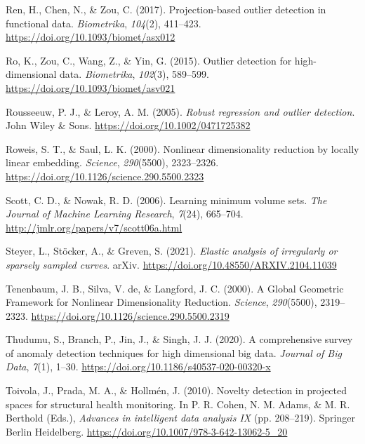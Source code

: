 \documentclass[
  10pt]{article}
\newlength{\cslhangindent}
\newlength{\cslentryspacingunit} %
\newenvironment{CSLReferences}[2] %
 {%
  \setlength{\parindent}{0pt}
  \ifodd #1
  \let\oldpar\par
  \def\par{\hangindent=\cslhangindent\oldpar}
  \fi
  \setlength{\parskip}{#2\cslentryspacingunit}
 }%
 {}
\begin{document}
\begin{CSLReferences}{1}{0}
\leavevmode{}%
Ren, H., Chen, N., \& Zou, C. (2017). Projection-based outlier detection in functional data. \emph{Biometrika}, \emph{104}(2), 411--423. \url{https://doi.org/10.1093/biomet/asx012}

\leavevmode{}%
Ro, K., Zou, C., Wang, Z., \& Yin, G. (2015). Outlier detection for high-dimensional data. \emph{Biometrika}, \emph{102}(3), 589--599. \url{https://doi.org/10.1093/biomet/asv021}

\leavevmode{}%
Rousseeuw, P. J., \& Leroy, A. M. (2005). \emph{Robust regression and outlier detection}. John Wiley \& Sons. \url{https://doi.org/10.1002/0471725382}

\leavevmode{}%
Roweis, S. T., \& Saul, L. K. (2000). Nonlinear dimensionality reduction by locally linear embedding. \emph{Science}, \emph{290}(5500), 2323--2326. \url{https://doi.org/10.1126/science.290.5500.2323}

\leavevmode{}%
Scott, C. D., \& Nowak, R. D. (2006). Learning minimum volume sets. \emph{The Journal of Machine Learning Research}, \emph{7}(24), 665--704. \url{http://jmlr.org/papers/v7/scott06a.html}

\leavevmode{}%
Steyer, L., Stöcker, A., \& Greven, S. (2021). \emph{Elastic analysis of irregularly or sparsely sampled curves}. arXiv. \url{https://doi.org/10.48550/ARXIV.2104.11039}

\leavevmode{}%
Tenenbaum, J. B., Silva, V. de, \& Langford, J. C. (2000). A {Global} {Geometric} {Framework} for {Nonlinear} {Dimensionality} {Reduction}. \emph{Science}, \emph{290}(5500), 2319--2323. \url{https://doi.org/10.1126/science.290.5500.2319}

\leavevmode{}%
Thudumu, S., Branch, P., Jin, J., \& Singh, J. J. (2020). A comprehensive survey of anomaly detection techniques for high dimensional big data. \emph{Journal of Big Data}, \emph{7}(1), 1--30. \url{https://doi.org/10.1186/s40537-020-00320-x}

\leavevmode{}%
Toivola, J., Prada, M. A., \& Hollmén, J. (2010). Novelty detection in projected spaces for structural health monitoring. In P. R. Cohen, N. M. Adams, \& M. R. Berthold (Eds.), \emph{Advances in intelligent data analysis IX} (pp. 208--219). Springer Berlin Heidelberg. \url{https://doi.org/10.1007/978-3-642-13062-5_20}


\end{CSLReferences}
\end{document}
